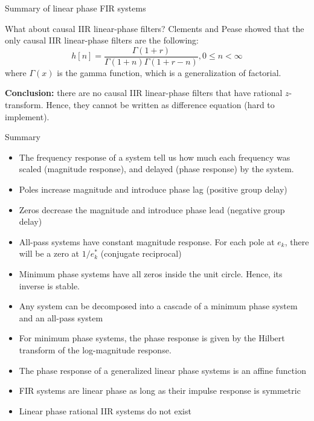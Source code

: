 \documentclass[10pt]{beamer}
\begin{document}
\begin{frame}{Summary of linear phase FIR systems}

\begin{center}
\end{center}

\end{frame}

\begin{frame}{What about causal IIR linear-phase filters?}
Clements and Pease showed that the only causal IIR linear-phase filters are the following:
\begin{equation*}
h[n] = \frac{\Gamma(1 + r)}{\Gamma(1+n)\Gamma(1+r-n)}, 0 \leq n < \infty
\end{equation*}
where $\Gamma(x)$ is the gamma function, which is a generalization of factorial. 

\textbf{Conclusion:} there are no causal IIR linear-phase filters that have rational $z$-transform. Hence, they cannot be written as difference equation (hard to implement).
\end{frame}


\begin{frame}{Summary}
\begin{itemize}
	\item The frequency response of a system tell us how much each frequency was scaled (magnitude response), and delayed (phase response) by the system.
	\item Poles increase magnitude and introduce phase lag (positive group delay)
	\item Zeros decrease the magnitude and introduce phase lead (negative group delay)
	\item All-pass systems have constant magnitude response. For each pole at $e_k$, there will be a zero at $1/e^*_k$ (conjugate reciprocal)
	\item Minimum phase systems have all zeros inside the unit circle. Hence, its inverse is stable.
	\item Any system can be decomposed into a cascade of a minimum phase system and an all-pass system
	\item For minimum phase systems, the phase response is given by the Hilbert transform of the log-magnitude response. 
	\item The phase response of a generalized linear phase systems is an affine function
	\item FIR systems are linear phase as long as their impulse response is symmetric
	\item Linear phase rational IIR systems do not exist
\end{itemize}
\end{frame}
\end{document}
